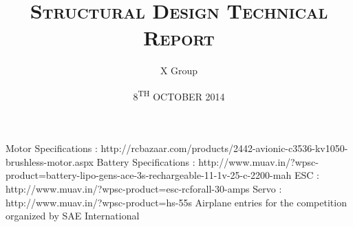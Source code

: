 \documentclass{iitm_course_report}
\begin{document}
\title{\textsc{\MakeUppercase Structural Design Technical Report}}
\author{X Group}
\date{8\textsuperscript{TH} OCTOBER 2014}
\maketitle
\cleardoublepage
%

\cleardoublepage
%

\cleardoublepage
\begin{singlespace}
\tableofcontents
\thispagestyle{empty}
\cleardoublepage
\listoftables
{}
\cleardoublepage
\listoffigures
{}
\end{singlespace}
\cleardoublepage

\cleardoublepage
\footskip=0.2in

\cleardoublepage

\cleardoublepage

\cleardoublepage
%
\begin{singlespace}


\end{singlespace}
\begin{thebibliography}{10}

   Motor Specifications : http://rcbazaar.com/products/2442-avionic-c3536-kv1050-brushless-motor.aspx
   Battery Specifications : http://www.muav.in/?wpsc-product=battery-lipo-gens-ace-3s-rechargeable-11-1v-25-c-2200-mah
   ESC : http://www.muav.in/?wpsc-product=esc-rcforall-30-amps
   Servo : http://www.muav.in/?wpsc-product=hs-55s
   Airplane entries for the competition organized by SAE International

\end{thebibliography}
  \renewcommand{\theequation}{A-\arabic{equation}}
  \renewcommand{\thesection}{A.\arabic{section}}
  \renewcommand{\thetable}{A.\arabic{table}}
  \renewcommand{\thefigure}{A.\arabic{figure}}
  \setcounter{equation}{0}  %
%
\end{document}
